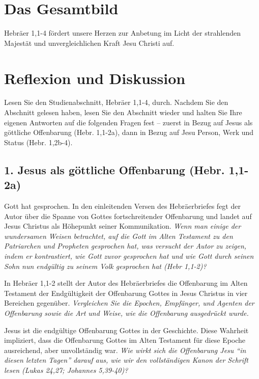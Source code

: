 \documentclass[headsepline=true]{book}
\begin{document}
\section{Das Gesamtbild}\label{das-gesamtbild}

Hebräer 1,1-4 fördert unsere Herzen zur Anbetung im Licht der
strahlenden Majestät und unvergleichlichen Kraft Jesu Christi auf.

\section{Reflexion und Diskussion}\label{reflexion-und-diskussion}

Lesen Sie den Studienabschnitt, Hebräer 1,1-4, durch. Nachdem Sie den
Abschnitt gelesen haben, lesen Sie den Abschnitt wieder und halten Sie
Ihre eigenen Antworten auf die folgenden Fragen fest -- zuerst in Bezug
auf Jesus als göttliche Offenbarung (Hebr. 1,1-2a), dann in Bezug auf
Jesu Person, Werk und Status (Hebr. 1,2b-4).

\subsection{1. Jesus als göttliche Offenbarung (Hebr.
1,1-2a)}\label{jesus-als-guxf6ttliche-offenbarung-hebr.-11-2a}

Gott hat gesprochen. In den einleitenden Versen des Hebräerbriefes fegt
der Autor über die Spanne von Gottes fortschreitender Offenbarung und
landet auf Jesus Christus als Höhepunkt seiner Kommunikation. \emph{Wenn
man einige der wundersamen Weisen betrachtet, auf die Gott im Alten
Testament zu den Patriarchen und Propheten gesprochen hat, was versucht
der Autor zu zeigen, indem er kontrastiert, wie Gott zuvor gesprochen
hat und wie Gott durch seinen Sohn nun endgültig zu seinem Volk
gesprochen hat (Hebr 1,1-2)?}

In Hebräer 1,1-2 stellt der Autor des Hebräerbriefes die Offenbarung im
Alten Testament der Endgültigkeit der Offenbarung Gottes in Jesus
Christus in vier Bereichen gegenüber. \emph{Vergleichen Sie die Epochen,
Empfänger, und Agenten der Offenbarung sowie die Art und Weise, wie die
Offenbarung ausgedrückt wurde.}

Jesus ist die endgültige Offenbarung Gottes in der Geschichte. Diese
Wahrheit impliziert, dass die Offenbarung Gottes im Alten Testament für
diese Epoche ausreichend, aber unvollständig war. \emph{Wie wirkt sich
die Offenbarung Jesu ``in diesen letzten Tagen'' darauf aus, wie wir den
vollständigen Kanon der Schrift lesen (Lukas 24,27; Johannes 5,39-40)?}
\end{document}
